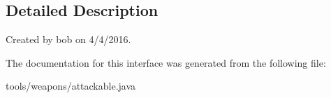 \subsection{Detailed Description}
Created by bob on 4/4/2016. 

The documentation for this interface was generated from the following file\+:\begin{DoxyCompactItemize}
\item 
tools/weapons/attackable.\+java\end{DoxyCompactItemize}
